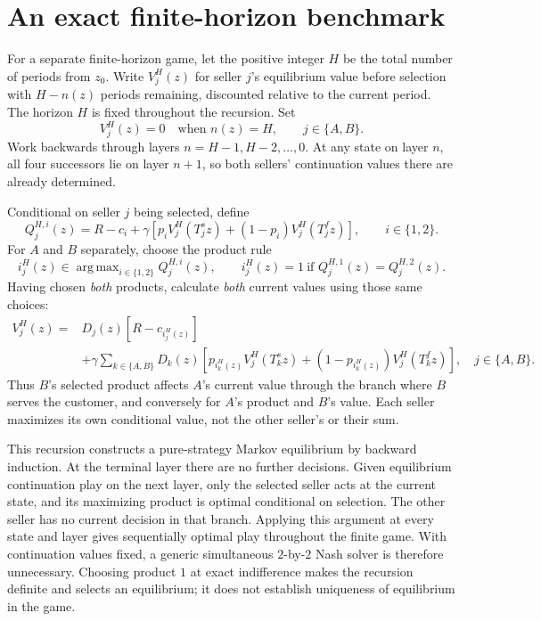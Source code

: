 \documentclass[11pt]{article}
\DeclareMathOperator*{\argmax}{arg\,max}
\begin{document}
\section{An exact finite-horizon benchmark}

For a separate finite-horizon game, let the positive integer $H$ be the
total number of periods from $z_0$. Write $V_j^H(z)$ for seller $j$'s
equilibrium value before selection with $H-n(z)$ periods remaining,
discounted relative to the current period. The horizon $H$ is fixed
throughout the recursion. Set
\begin{equation}\label{eq:terminal}
V_j^H(z)=0\quad\text{when }n(z)=H,\qquad j\in\{A,B\}.
\end{equation}
Work backwards through layers $n=H-1,H-2,\ldots,0$. At any state on
layer $n$, all four successors lie on layer $n+1$, so both sellers'
continuation values there are already determined.

Conditional on seller $j$ being selected, define
\begin{equation}\label{eq:finite-q}
Q_j^{H,i}(z)=R-c_i+\gamma\left[
p_iV_j^H(T_j^s z)+(1-p_i)V_j^H(T_j^f z)\right],
\qquad i\in\{1,2\}.
\end{equation}
For $A$ and $B$ separately, choose the product rule
\begin{equation}\label{eq:finite-policy}
i_j^H(z)\in\argmax_{i\in\{1,2\}}Q_j^{H,i}(z),\qquad
i_j^H(z)=1\ \text{if }Q_j^{H,1}(z)=Q_j^{H,2}(z).
\end{equation}
Having chosen \emph{both} products, calculate \emph{both} current
values using those same choices:
\begin{equation}\label{eq:finite-evaluation}
\begin{aligned}
V_j^H(z)={}&D_j(z)[R-c_{i_j^H(z)}]\\
&+\gamma\sum_{k\in\{A,B\}}D_k(z)
\left[p_{i_k^H(z)}V_j^H(T_k^s z)
+(1-p_{i_k^H(z)})V_j^H(T_k^f z)\right],
\quad j\in\{A,B\}.
\end{aligned}
\end{equation}
Thus $B$'s selected product affects $A$'s current value through the
branch where $B$ serves the customer, and conversely for $A$'s product
and $B$'s value. Each seller maximizes its own conditional value,
not the other seller's or their sum.

This recursion constructs a pure-strategy Markov equilibrium by backward
induction. At the terminal layer there are no further decisions.
Given equilibrium continuation play on the next layer, only the
selected seller acts at the current state, and its maximizing product
is optimal conditional on selection. The other seller has no current
decision in that branch. Applying this argument at every state and
layer gives sequentially optimal play throughout the finite game.
With continuation values fixed, a generic simultaneous $2$-by-$2$
Nash solver is therefore unnecessary. Choosing product $1$ at exact
indifference makes the recursion definite and selects an equilibrium;
it does not establish uniqueness of equilibrium in the game.
\end{document}
